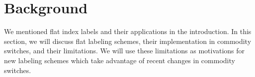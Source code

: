 \section{Background} \label{sec:background}




We mentioned flat index labels and their applications in the introduction. In this section, we will discuss flat labeling schemes, their implementation in commodity switches, and their limitations. We will use these limitations as motivations for new labeling schemes which take advantage of recent changes in commodity switches.

